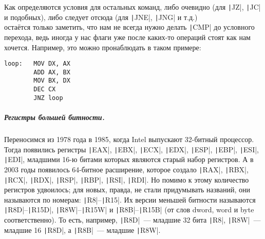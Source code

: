 \documentclass{article}
\begin{document}
    Как определяются условия для остальных команд, либо очевидно (для \texttt|JZ|, \texttt|JC| и подобных), либо следует отсюда (для \texttt|JNE|, \texttt|JNG| и т.д.)\\
    остаётся только заметить, что нам не всегда нужно делать \texttt|CMP| до условного перехода, ведь иногда у нас флаги уже после каких-то операций стоят как нам хочется. Например, это можно пронаблюдать в таком примере:
    \begin{verbatim}
loop:   MOV DX, AX
        ADD AX, BX
        MOV BX, DX
        DEC CX
        JNZ loop
    \end{verbatim}
    \subparagraph{Регистры большей битности.}
    Переносимся из 1978 года в 1985, когда Intel выпускают 32-битный процессор. Тогда появились регистры \texttt|EAX|, \texttt|EBX|, \texttt|ECX|, \texttt|EDX|, \texttt|ESP|, \texttt|EBP|, \texttt|ESI|, \texttt|EDI|, младшими 16-ю битами которых являются старый набор регистров. А в 2003 годы появилось 64-битное расширение, которое создало \texttt|RAX|, \texttt|RBX|, \texttt|RCX|, \texttt|RDX|, \texttt|RSP|, \texttt|RBP|, \texttt|RSI|, \texttt|RDI|. Но помимо к этому количество регистров удвоилось; для новых, правда, не стали придумывать названий, они называются по номерам: \texttt|R8|--\texttt|R15|. Их версии меньшей битности называются \texttt|R8D|--\texttt|R15D|, \texttt|R8W|--\texttt|R15W| и \texttt|R8B|--\texttt|R15B| (от слов dword, word и byte соответственно). То есть, например, \texttt|R8D|~--- младшие 32 бита \texttt|R8|, \texttt|R8W|~--- младшие 16 \texttt|R8D|, а \texttt|R8B|~--- младшие \texttt|R8W|.
\end{document}
